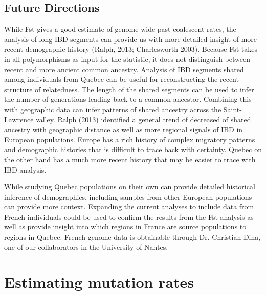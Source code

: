 \documentclass[
11pt, %
oneside, %
english, %
doublespacing, %
headsepline, %
]{MastersDoctoralThesis} %
\begin{document}
\section{Future Directions}
While Fst gives a good estimate of genome wide past coalescent rates, the analysis of long IBD segments can provide us with more detailed insight of more recent demographic history (Ralph, 2013; Charlesworth 2003).
Because Fst takes in all polymorphisms as input for the statistic, it does not distinguish between recent and more ancient common ancestry.
Analysis of IBD segments shared among individuals from Quebec can be useful for reconstructing the recent structure of relatedness.
The length of the shared segments can be used to infer the number of generations leading back to a common ancestor.
Combining this with geographic data can infer patterns of shared ancestry across the Saint-Lawrence valley.
Ralph (2013) identified a general trend of decreased of shared ancestry with geographic distance as well as more regional signals of IBD in European populations.
Europe has a rich history of complex migratory patterns and demographic histories that is difficult to trace back with certainty. 
Quebec on the other hand has a much more recent history that may be easier to trace with IBD analysis.

While studying Quebec populations on their own can provide detailed historical inference of demographics, including samples from other European populations can provide more context.
Expanding the current analyses to include data from French individuals could be used to confirm the results from the Fst analysis as well as provide insight into which regions in France are source populations to regions in Quebec.
French genome data is obtainable through Dr. Christian Dina, one of our collaborators in the University of Nantes. 

\chapter{Estimating mutation rates}
\end{document}
